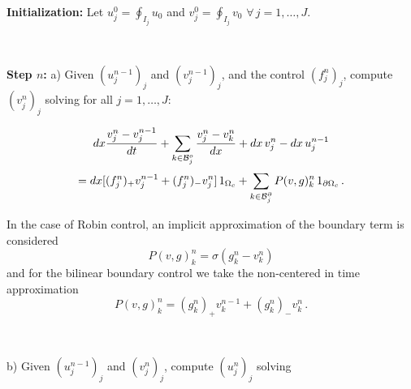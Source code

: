 \documentclass[11pt]{article}
\def \hueco{\noalign{\medskip}}
\def \beq{\begin{equation}}
\def \eeq{\end{equation}}
\def \ba{\begin{array}}
\def \ea{\end{array}}
\def \dis{\displaystyle}
\numberwithin{theorem}{section}
\begin{document}
\

\textbf{Initialization:} Let
$
u_j^0=\oint_{I_j}u_0$ and $v_j^0=\oint_{I_j}v_0$ $\forall\, j=1,\dots,J.
$

\

\textbf{Step $n$:}  a) Given $(u_j^{n-1})_j$ and $(v_j^{n-1})_j$, and the control $(f_j^{n})_j$, 
compute $(v_j^{n})_j$  solving for all $j=1,\dots,J$:

\beq\label{eq:scheme_v}
\ba{c}\dis
dx\frac{v_j^n-v_j^{n-1}}{dt}
+\sum_{k\in {\cal B}_j^o }    \frac{v_{j}^n-v_k^{n}}{dx}
    + dx\, v_j^n - dx\, u_j^{n-1}
\\ \hueco\dis
    =dx [ (f^n_j)_+v^{n-1}_j+(f_j^n)_-v^n_j]\, 1_{\Omega_c}
    + \sum_{k\in {\cal B}_j^\partial } P(v,g)^n_k\, 1_{\partial\Omega_c}\,.
\ea
\eeq
    
In the case of Robin control,  an implicit approximation of the boundary term is considered 
    $$P(v,g)^n_k=\sigma(g^n_k-v^n_k)%
    $$ and for the bilinear  boundary control  we take the non-centered in time approximation 
    $$P(v,g)^n_k= (g^n_k)_+ v^{n-1}_k + (g^n_k)_- v^{n}_k\,.
    $$

\
    
  b) Given $(u_j^{n-1})_j$ and $(v_j^{n})_j$, compute $(u_j^{n})_j$  solving 
      
\end{document}
